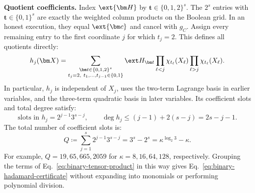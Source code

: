 \smallskip\noindent\textbf{Quotient coefficients.}
Index \(\ext{\bm H}\) by
\(\bm t\in\{0,1,2\}^s\).
The \(2^s\) entries with \(\bm t\in\{0,1\}^s\) are exactly
the weighted column products on the Boolean grid. In an honest
execution, they equal \(\ext{\bm c}\) and cancel with \(g_C\).
Assign every remaining entry to the first coordinate \(j\) for
which \(t_j=2\). This defines all quotients directly:
\begin{equation}
    h_j(\bm X)=
    \sum_{\substack{\bm t\in\{0,1,2\}^s\\
                    t_j=2,\ t_1,\ldots,t_{j-1}\in\{0,1\}}}
        \ext H_{\bm t}
        \prod_{\ell<j}\chi_{t_\ell}(X_\ell)
        \prod_{\ell>j}\chi_{t_\ell}(X_\ell).
\label{eq:binary-mixed-quotients}
\end{equation}
In particular, \(h_j\) is independent of \(X_j\), uses the
two-term Lagrange basis in earlier variables, and the three-term
quadratic basis in later variables. Its coefficient slots and
total degree satisfy:
\[
    \text{slots in }h_j=2^{j-1}3^{s-j},
    \qquad
    \deg h_j\leq(j-1)+2(s-j)=2s-j-1.
\]
The total number of coefficient slots is:
\begin{equation}
    Q\coloneqq\sum_{j=1}^s2^{j-1}3^{s-j}
      =3^s-2^s=\kappa^{\log_2 3}-\kappa.
\label{eq:binary-quotient-size}
\end{equation}
For example, \(Q=19,65,665,2059\) for
\(\kappa=8,16,64,128\), respectively.
Grouping the terms of Eq.~\eqref{eq:binary-tensor-product} in
this way gives Eq.~\eqref{eq:binary-hadamard-certificate}
without expanding into monomials or performing polynomial division.


